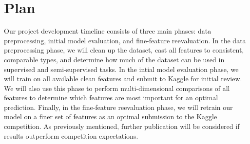 \documentclass[12pt]{extarticle}
\begin{document}
\section{Plan}

Our project development timeline consists of three main phases: data preprocessing, initial model evaluation, and fine-feature reevaluation.
In the data preprocessing phase, we will clean up the dataset, cast all features to consistent, comparable types, and determine how much of the dataset can be used in supervised and semi-supervised tasks.
In the intial model evaluation phase, we will train on all available clean features and submit to Kaggle for initial review. 
We will also use this phase to perform multi-dimensional comparisons of all features to determine which features are most important for an optimal prediction.
Finally, in the fine-feature reevaluation phase, we will retrain our model on a finer set of features as an optimal submission to the Kaggle competition.
As previously mentioned, further publication will be considered if results outperform competition expectations.



\end{document}
